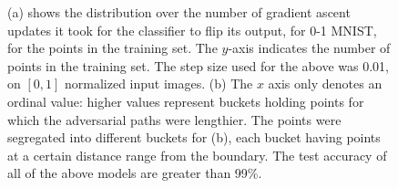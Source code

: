 \documentclass{ociamthesis}
\begin{document}
    \begin{figure}[!h]
        \centering
        \qquad
         \caption{(a) shows the distribution
        over the number of gradient ascent updates it took for the classifier to
        flip its output, for 0-1 MNIST, for the points in the training set. The
        $y$-axis indicates the number of points in the training set. The step
        size used for the above was 0.01, on $[0, 1]$ normalized input images.
        (b) The $x$ axis only denotes an ordinal value: higher values represent
        buckets holding points for which the adversarial paths were lengthier.
        The points were segregated into different buckets for (b), each bucket
        having points at a certain distance range from the boundary. The test
        accuracy of all of the above models are greater than 99\%.}
        \label{fig:0-1-mnist-pgd-path}
    \end{figure}
\end{document}
